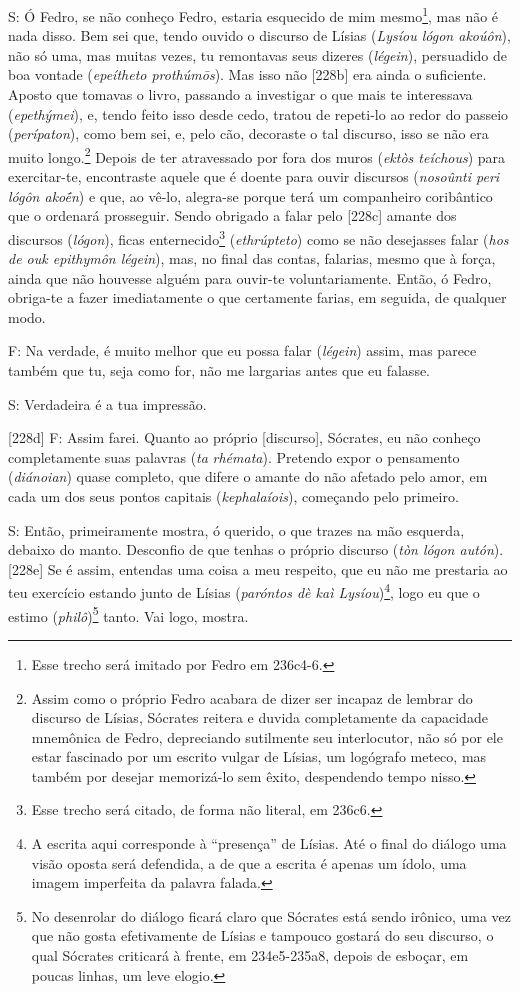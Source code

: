 S: Ó Fedro, se não conheço Fedro, estaria esquecido de mim
mesmo\footnote{Esse trecho será imitado por Fedro em 236c4-6.}, mas não
é nada disso. Bem sei que, tendo ouvido o discurso de Lísias
(\emph{Lysíou lógon akoúôn}), não só uma, mas muitas vezes, tu
remontavas seus dizeres (\emph{légein}), persuadido de boa vontade
(\emph{epeítheto prothúmōs}). Mas isso não {[}228b{]} era ainda o
suficiente. Aposto que tomavas o livro, passando a investigar o que mais
te interessava (\emph{epethýmei}), e, tendo feito isso desde cedo,
tratou de repeti-lo ao redor do passeio (\emph{perípaton}), como bem
sei, e, pelo cão, decoraste o tal discurso, isso se não era muito
longo.\footnote{Assim como o próprio Fedro acabara de dizer ser incapaz
  de lembrar do discurso de Lísias, Sócrates reitera e duvida
  completamente da capacidade mnemônica de Fedro, depreciando sutilmente
  seu interlocutor, não só por ele estar fascinado por um escrito vulgar
  de Lísias, um logógrafo meteco, mas também por desejar memorizá-lo sem
  êxito, despendendo tempo nisso.} Depois de ter atravessado por fora
dos muros (\emph{ektòs teíchous}) para exercitar-te, encontraste aquele
que é doente para ouvir discursos (\emph{nosoûnti peri lógôn akoḗn}) e
que, ao vê-lo, alegra-se porque terá um companheiro coribântico que o
ordenará prosseguir. Sendo obrigado a falar pelo {[}228c{]} amante dos
discursos (\emph{lógon}), ficas enternecido\footnote{Esse trecho será
  citado, de forma não literal, em 236c6.} (\emph{ethrúpteto}) como se
não desejasses falar (\emph{hos de ouk epithymôn légein}), mas, no final
das contas, falarias, mesmo que à força, ainda que não houvesse alguém
para ouvir-te voluntariamente. Então, ó Fedro, obriga-te a fazer
imediatamente o que certamente farias, em seguida, de qualquer modo.

F: Na verdade, é muito melhor que eu possa falar (\emph{légein}) assim,
mas parece também que tu, seja como for, não me largarias antes que eu
falasse.

S: Verdadeira é a tua impressão.

{[}228d{]} F: Assim farei. Quanto ao próprio {[}discurso{]}, Sócrates,
eu não conheço completamente suas palavras (\emph{ta} \emph{rhémata}).
Pretendo expor o pensamento (\emph{diánoian}) quase completo, que difere
o amante do não afetado pelo amor, em cada um dos seus pontos capitais
(\emph{kephalaíois}), começando pelo primeiro.

S: Então, primeiramente mostra, ó querido, o que trazes na mão esquerda,
debaixo do manto. Desconfio de que tenhas o próprio discurso (\emph{tòn
lógon autón}). {[}228e{]} Se é assim, entendas uma coisa a meu respeito,
que eu não me prestaria ao teu exercício estando junto de Lísias
(\emph{paróntos dè kaì Lysíou})\footnote{A escrita aqui corresponde à
  ``presença'' de Lísias. Até o final do diálogo uma visão oposta será
  defendida, a de que a escrita é apenas um ídolo, uma imagem imperfeita
  da palavra falada.}, logo eu que o estimo (\emph{philô})\footnote{No
  desenrolar do diálogo ficará claro que Sócrates está sendo irônico,
  uma vez que não gosta efetivamente de Lísias e tampouco gostará do seu
  discurso, o qual Sócrates criticará à frente, em 234e5-235a8, depois
  de esboçar, em poucas linhas, um leve elogio.} tanto. Vai logo,
mostra.

